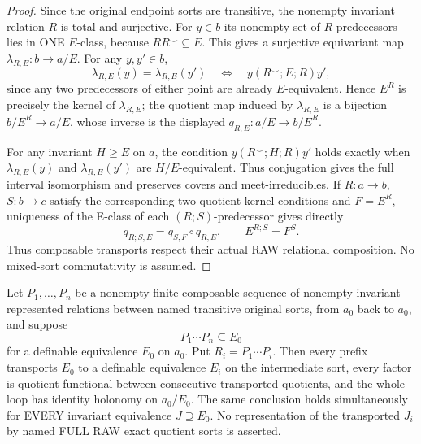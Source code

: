 \begin{proof}
Since the original endpoint sorts are transitive,
the nonempty invariant relation $R$ is total and
surjective. For $y\in b$ its nonempty set of
$R$-predecessors lies in ONE $E$-class, because
$RR^\smile\subseteq E$. This gives a surjective
equivariant map $\lambda_{R,E}:b\to a/E$.
For any $y,y'\in b$,
\[
 \lambda_{R,E}(y)=\lambda_{R,E}(y')
  \quad\Longleftrightarrow\quad
             y(R^\smile;E;R)y',
\]
since any two predecessors of either point
are already $E$-equivalent. Hence $E^R$
is precisely the kernel of $\lambda_{R,E}$;
the quotient map induced by $\lambda_{R,E}$
is a bijection $b/E^R\to a/E$, whose inverse
is the displayed $q_{R,E}:a/E\to b/E^R$.

For any invariant $H\ge E$ on $a$, the
condition $y(R^\smile;H;R)y'$ holds exactly
when $\lambda_{R,E}(y)$ and
$\lambda_{R,E}(y')$ are $H/E$-equivalent.
Thus conjugation gives the full interval
isomorphism and preserves covers and
meet-irreducibles. If $R:a\to b$, $S:b\to c$ satisfy
the corresponding two quotient kernel
conditions and $F=E^R$, uniqueness of
the E-class of each $(R;S)$-predecessor
gives directly
\[
 q_{R;S,E}=q_{S,F}\circ q_{R,E},
 \qquad E^{R;S}=F^S.
\]
Thus composable transports respect their
actual RAW relational composition.
No mixed-sort commutativity is assumed.
\end{proof}

\begin{lemma}\label{lem:foundational-typed-return-holonomy}
Let \(P_1,\ldots,P_n\) be a nonempty finite composable sequence
of nonempty invariant represented relations between named transitive
original sorts, from \(a_0\) back to \(a_0\), and suppose
\[
 P_1\cdots P_n\subseteq E_0
\]
for a definable equivalence \(E_0\) on \(a_0\).  Put
\(R_i=P_1\cdots P_i\).  Then every prefix transports \(E_0\) to a definable
equivalence \(E_i\) on the intermediate sort, every factor is
quotient-functional between consecutive transported quotients, and the whole
loop has identity holonomy on \(a_0/E_0\).  The same conclusion holds
simultaneously for EVERY invariant equivalence \(J\supseteq E_0\).
No representation of the transported \(J_i\) by named FULL RAW exact
quotient sorts is asserted.
\end{lemma}


